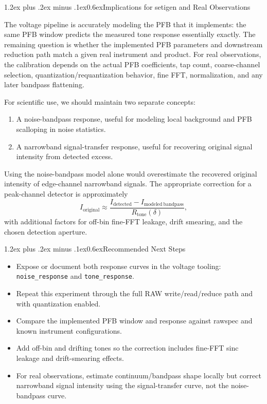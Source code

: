\documentclass[10pt]{article}
\makeatletter
\renewcommand\section{\@startsection{section}{1}{0pt}%
  {1.2ex plus .2ex minus .1ex}{0.6ex}{\normalsize\bfseries}}
\makeatother
\begin{document}
\section{Implications for setigen and Real Observations}

The voltage pipeline is accurately modeling the PFB that it implements: the
same PFB window predicts the measured tone response essentially exactly.  The
remaining question is whether the implemented PFB parameters and downstream
reduction path match a given real instrument and product.  For real
observations, the calibration depends on the actual PFB coefficients, tap count,
coarse-channel selection, quantization/requantization behavior, fine FFT,
normalization, and any later bandpass flattening.

For scientific use, we should maintain two separate concepts:
\begin{enumerate}
    \item A noise-bandpass response, useful for modeling local background and
    PFB scalloping in noise statistics.
    \item A narrowband signal-transfer response, useful for recovering original
    signal intensity from detected excess.
\end{enumerate}
Using the noise-bandpass model alone would overestimate the recovered original
intensity of edge-channel narrowband signals.  The appropriate correction for a
peak-channel detector is approximately
\[
    I_{\mathrm{original}} \approx
    \frac{I_{\mathrm{detected}} - I_{\mathrm{modeled\ bandpass}}}
         {R_{\mathrm{tone}}(\delta)} ,
\]
with additional factors for off-bin fine-FFT leakage, drift smearing, and the
chosen detection aperture.

\section{Recommended Next Steps}

\begin{itemize}
    \item Expose or document both response curves in the voltage tooling:
    \texttt{noise\_response} and \texttt{tone\_response}.
    \item Repeat this experiment through the full RAW write/read/reduce path and
    with quantization enabled.
    \item Compare the implemented PFB window and response against rawspec and
    known instrument configurations.
    \item Add off-bin and drifting tones so the correction includes fine-FFT
    sinc leakage and drift-smearing effects.
    \item For real observations, estimate continuum/bandpass shape locally but
    correct narrowband signal intensity using the signal-transfer curve, not the
    noise-bandpass curve.
\end{itemize}
\end{document}
